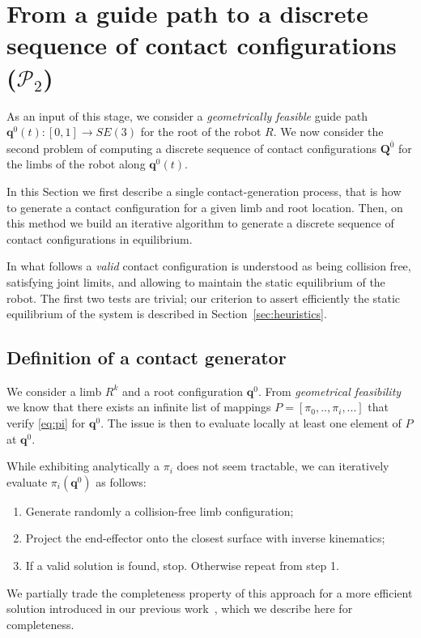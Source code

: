 \section{From a guide path to a discrete sequence of contact configurations ($\mathcal{P}_2$)}
\label{sec:contact}
As an input of this stage, we consider a \textit{geometrically feasible} guide path $\mathbf{q}^0(t) : [0,1] \longrightarrow SE(3)$ for the root of the robot $R$. We now consider the second problem of computing a discrete sequence of contact configurations $\mathbf{Q}^{\overline{0}}$ for the limbs of the robot along $\mathbf{q}^0(t)$.

In this Section we first describe a single contact-generation process, that is how to generate a contact configuration for a given limb 
and root location.
Then, on this method we build an iterative algorithm to generate a discrete sequence of contact configurations in equilibrium.

In what follows a \textit{valid} contact configuration is understood as being collision free, satisfying joint limits, and allowing to maintain the static equilibrium
of the robot. The first two tests are trivial; our criterion to assert efficiently the static equilibrium of the system
is described in Section~\ref{sec:heuristics}.

\subsection{Definition of a contact generator}
\label{sec:single_contact}
We consider a limb $R^k$  and a root configuration $\mathbf{q}^0$.
From \textit{geometrical feasibility} we know that there exists an infinite list of mappings $P = [\pi_0,..,\pi_i, ...]$ that verify \eqref{eq:pi} for $\mathbf{q}^0$.
The issue is then to evaluate locally at least one element of $P$ at $\mathbf{q}^0$.

While exhibiting analytically a $\pi_i$ does not seem tractable, we can iteratively evaluate $\pi_i(\mathbf{q}^0)$ as follows:
\begin{enumerate}
\item Generate randomly a collision-free limb configuration;
\item Project the end-effector onto the closest surface with inverse kinematics;
\item If a valid solution is found, stop. Otherwise repeat from step 1.
\end{enumerate}


We partially trade the completeness property of this approach for a more efficient solution introduced in our previous work~\citep{Tonneau2014}, which we describe
here for completeness.

